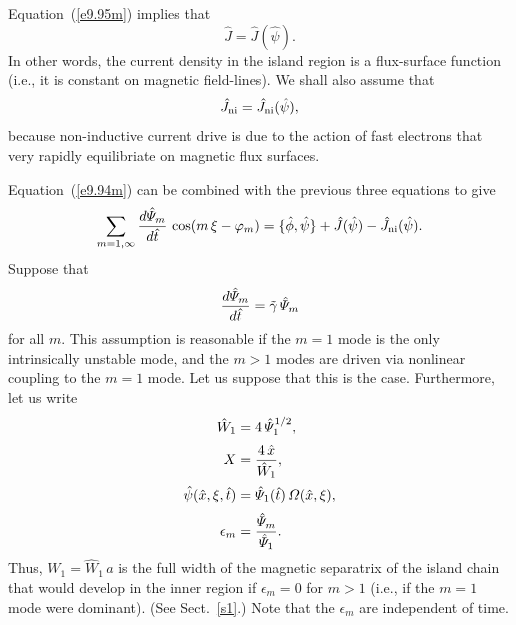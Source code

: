 \documentclass[12pt,prb,aps]{revtex4-1}
\begin{document}
Equation~(\ref{e9.95m}) implies that
\begin{equation}\label{e9.98m}
\hat{J} = \hat{J}(\hat{\psi}).
\end{equation}
In other words, the current density in the island region is a flux-surface function (i.e., it is constant
on magnetic field-lines). We shall also assume that
\begin{equation}
\hat{J}_{\rm ni} = \hat{J}_{\rm ni}(\hat{\psi}), 
\end{equation}
because non-inductive current drive is due to the action of fast electrons that very rapidly equilibriate on
magnetic flux surfaces. 

Equation~(\ref{e9.94m}) can be combined with the previous three equations to give 
\begin{equation}\label{e41}
\sum_{m=1,\infty}\frac{d\hat{\mit\Psi}_m}{d\hat{t}}\,\cos(m\,\xi-\varphi_m)=\{\skew{3}\hat{\phi},\hat{\psi}\}+\hat{J}(\hat{\psi})-\hat{J}_{\rm ni}(\hat{\psi}). 
\end{equation}
Suppose that
\begin{equation}\label{e42}
\frac{d\hat{\mit\Psi}_m}{d\hat{t}} =\tilde{\gamma}\,\hat{\mit\Psi}_m
\end{equation}
for all $m$. This assumption is reasonable if the $m=1$ mode is the only intrinsically unstable mode, and the $m>1$ modes are driven via nonlinear coupling  to the $m=1$ mode. Let us suppose that this is the case. Furthermore, let us write
\begin{align}
\hat{W}_1 &= 4\,\hat{\mit\Psi}_1^{1/2},\label{e43}\\[0.5ex]
X &= \frac{4\,\hat{x}}{\hat{W}_1},\label{e44}\\[0.5ex]
\hat{\psi}(\hat{x},\xi,\hat{t}) &= \hat{\mit\Psi}_1(\hat{t})\,{\mit\Omega}(\hat{x},\xi),\\[0.5ex]
\epsilon_m &= \frac{\hat{\mit\Psi}_m}{\hat{\mit\Psi}_1}.\label{e46}
\end{align}
Thus, $W_1=\hat{W}_1\,a$ is the full width of the magnetic separatrix of the island chain that would develop in the inner region if $\epsilon_m=0$ for $m>1$ (i.e., if the $m=1$ mode were dominant). (See Sect.~\ref{s1}.) Note that the $\epsilon_m$ are independent of time. 
\end{document}
